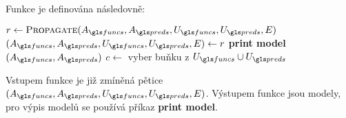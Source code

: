 Funkce  je definována následovně:
\medskip
\begin{algorithmic}
  \State $r \gets \Call{Propagate}{A_\funcs, A_\preds, U_\funcs, U_\preds, E}$
    \State $(A_\funcs, A_\preds, U_\funcs, U_\preds, E) \gets r$
      \State \textbf{print model} $(A_\funcs, A_\preds)$
    \Else
      \State $c \gets$ vyber buňku z $U_\funcs \cup U_\preds$
          \State {}
        \EndFor
      \Else
        \State {}
        \State {}
      \EndIf
    \EndIf
  \EndIf
\EndFunction
\end{algorithmic}
\medskip

Vstupem funkce  je již zmíněná pětice
$(A_\funcs, A_\preds, U_\funcs, U_\preds, E)$. Výstupem funkce
 jsou modely, pro výpis modelů se používá příkaz
\textbf{print model}.

